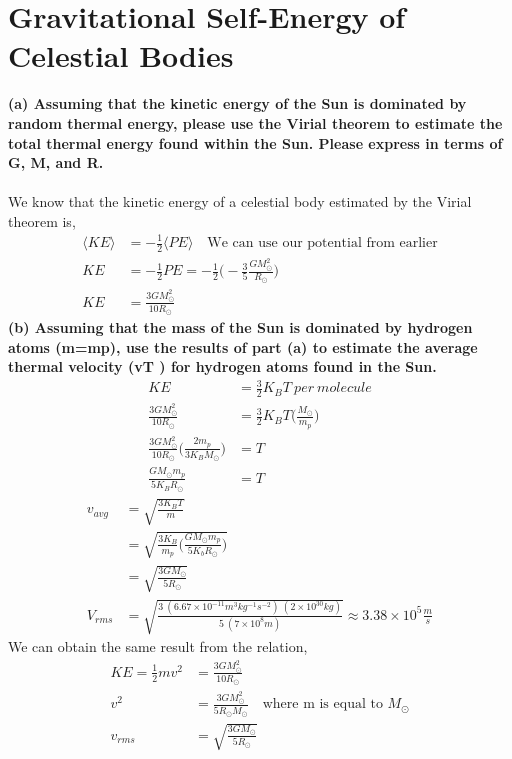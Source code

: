 \documentclass[paper=a4, fontsize=11pt]{scrartcl} %
\numberwithin{equation}{section} %
\numberwithin{figure}{section} %
\numberwithin{table}{section} %
\begin{document}
\section{Gravitational Self-Energy of Celestial Bodies}
\textbf{(a) Assuming that the kinetic energy of the Sun is dominated by random thermal energy,
please use the Virial theorem to estimate the total thermal energy found within the Sun.
Please express in terms of G, M, and R.}\\
\\
We know that the kinetic energy of a celestial body estimated by the Virial theorem is,
\begin{align*}
\langle KE \rangle & = -\frac{1}{2} \langle PE\rangle \quad \text{We can use our potential from earlier} \\ 
KE & = -\frac{1}{2}PE = -\frac{1}{2} \Big ( - \frac{3}{5} \frac{G M_{\odot}^2}{R_{\odot}} \Big)\\
KE& = \frac{3GM^2_{\odot}}{10R_{\odot}}
\end{align*} 
\textbf{(b) Assuming that the mass of the Sun is dominated by hydrogen atoms (m=mp), use the
results of part (a) to estimate the average thermal velocity (vT ) for hydrogen atoms found
in the Sun.}
\begin{align*}
KE & = \frac{3}{2} K_BT\ per\ molecule \\
\frac{3GM^2_{\odot}}{10R_{\odot}} & = \frac{3}{2} K_BT\big ( \tfrac{M_{\odot}}{m_p} \big) \\
\frac{3GM^2_{\odot}}{10R_{\odot}} \bigg( \frac{2 m_p}{3 K_B M_{\odot}} \bigg) & = T\\
\frac{GM_{\odot} m_p}{5K_BR_{\odot}} & = T
\end{align*}
\begin{align*}
v_{avg} & = \sqrt{\tfrac{3K_BT}{m}} \\
&= \sqrt{\tfrac{3K_B}{m_p} \bigg (\tfrac{GM_{\odot}m_p}{5K_bR_{\odot} }\bigg )} \\
& = \sqrt{\tfrac{3GM_{\odot}}{5R_{\odot}}} \\
V_{rms} & = \sqrt{\tfrac{3\ (6.67\times 10^{-11}m^3 kg^{-1} s^{-2})\ (2\times 10^{30} kg)}{5\ (7\times 10^8 m)}} \approx 3.38 \times 10^5 \tfrac{m}{s}
\end{align*}
We can obtain the same result from the relation,
\begin{align*}
KE = \frac{1}{2}mv^2 & = \frac{3GM_{\odot}^2}{10 R_{\odot}}\\
v^2 & = \frac{3GM_{\odot}^2}{5R_{\odot} M_{\odot}} \quad \text{where m is equal to $M_{\odot}$} \\
v_{rms} & = \sqrt{\frac{3GM_{\odot}}{5R_{\odot}}}
\end{align*}
\end{document}
